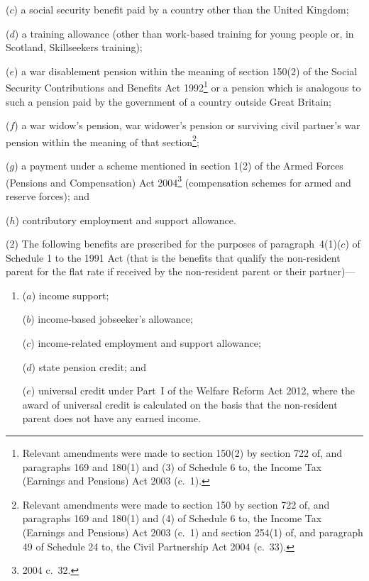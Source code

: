 \documentclass[12pt,a4paper]{article}
\begin{document}
\begin{enumerate}
($c$) a social security benefit paid by a country other than the United Kingdom;

($d$) a training allowance (other than work-based training for young people or, in Scotland, Skillseekers training);

($e$) a war disablement pension within the meaning of section 150(2) of the Social Security Contributions and Benefits Act 1992\footnote{Relevant amendments were made to section 150(2) by section 722 of, and paragraphs 169 and 180(1) and (3) of Schedule 6 to, the Income Tax (Earnings and Pensions) Act 2003 (c.~1).} or a pension which is analogous to such a pension paid by the government of a country outside Great Britain;

($f$) a war widow’s pension, war widower’s pension or surviving civil partner’s war pension within the meaning of that section\footnote{Relevant amendments were made to section 150 by section 722 of, and paragraphs 169 and 180(1) and (4) of Schedule 6 to, the Income Tax (Earnings and Pensions) Act 2003 (c.~1) and section 254(1) of, and paragraph 49 of Schedule 24 to, the Civil Partnership Act 2004 (c.~33).};

($g$) a payment under a scheme mentioned in section 1(2) of the Armed Forces (Pensions and Compensation) Act 2004\footnote{2004 c.~32.} (compensation schemes for armed and reserve forces); and

($h$) contributory employment and support allowance.
\end{enumerate}

\begin{sloppypar}
(2) The following benefits are prescribed for the purposes of paragraph~4(1)($c$)  of Schedule 1 to the 1991 Act (that is the benefits that qualify the non-resident parent for the flat rate if received by the non-resident parent or their partner)—
\end{sloppypar}
\begin{enumerate}\item[]
($a$) income support;

($b$) income-based jobseeker’s allowance;

($c$) income-related employment and support allowance; 

($d$) state pension credit;
%
and

($e$) universal credit under Part~I of the Welfare Reform Act 2012, where the award of universal credit is calculated on the basis that the non-resident parent does not have any earned income.
\end{enumerate}
\end{document}

